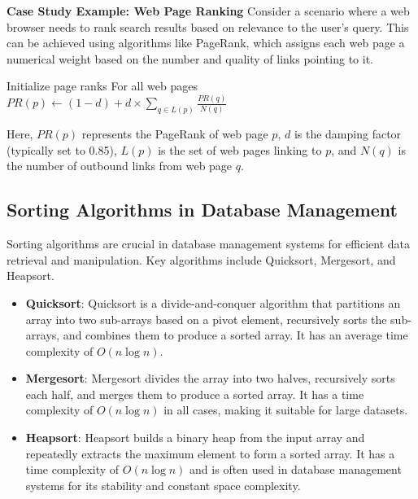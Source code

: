 \documentclass[12pt]{book} %
\begin{document}
\textbf{Case Study Example: Web Page Ranking}
Consider a scenario where a web browser needs to rank search results based on relevance to the user's query. This can be achieved using algorithms like PageRank, which assigns each web page a numerical weight based on the number and quality of links pointing to it.
\FloatBarrier
\begin{algorithm}
\caption{PageRank Algorithm}
\begin{algorithmic}[1]
\State Initialize page ranks For all web pages
\Repeat
{}
\State $PR(p) \leftarrow (1-d) + d \times \sum_{q \in L(p)} \frac{PR(q)}{N(q)}$
\EndFor
{}
\end{algorithmic}
\end{algorithm}
\FloatBarrier
Here, $PR(p)$ represents the PageRank of web page $p$, $d$ is the damping factor (typically set to 0.85), $L(p)$ is the set of web pages linking to $p$, and $N(q)$ is the number of outbound links from web page $q$.

\FloatBarrier
\subsection{Sorting Algorithms in Database Management}
Sorting algorithms are crucial in database management systems for efficient data retrieval and manipulation. Key algorithms include Quicksort, Mergesort, and Heapsort.

\begin{itemize}
    \item \textbf{Quicksort}: Quicksort is a divide-and-conquer algorithm that partitions an array into two sub-arrays based on a pivot element, recursively sorts the sub-arrays, and combines them to produce a sorted array. It has an average time complexity of $O(n \log n)$.
    
    \item \textbf{Mergesort}: Mergesort divides the array into two halves, recursively sorts each half, and merges them to produce a sorted array. It has a time complexity of $O(n \log n)$ in all cases, making it suitable for large datasets.
    
    \item \textbf{Heapsort}: Heapsort builds a binary heap from the input array and repeatedly extracts the maximum element to form a sorted array. It has a time complexity of $O(n \log n)$ and is often used in database management systems for its stability and constant space complexity.
\end{itemize}
\end{document}

